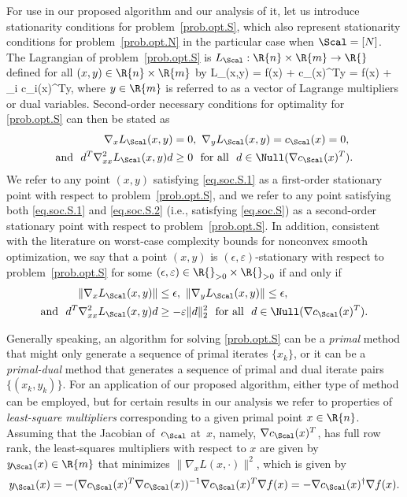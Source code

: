 For use in our proposed algorithm and our analysis of it, let us introduce stationarity conditions for problem~\eqref{prob.opt.S}, which also represent stationarity conditions for problem~\eqref{prob.opt.N} in the particular case when $\Scal = [N]$.  The Lagrangian of problem~\eqref{prob.opt.S} is $L_\Scal : \R{n} \times \R{m} \to \R{}$ defined for all $(x,y) \in \R{n} \times \R{m}$ by
\bequationNN
  L_\Scal(x,y) = f(x) + c_\Scal(x)^Ty = f(x) +  \sum_{i \in \Scal} c_i(x)^Ty,
\eequationNN
where $y \in \R{m}$ is referred to as a vector of Lagrange multipliers or dual variables.  Second-order necessary conditions for optimality for \eqref{prob.opt.S} can then be stated as
\bsubequations\label{eq.soc.S}
  \begin{align}
    \nabla_x L_\Scal(x,y) &= 0,\  \nabla_y L_\Scal(x,y) = c_\Scal(x)=0,\label{eq.soc.S.1} \\ \text{and}\ \ 
    d^T \nabla_{xx}^2 L_\Scal(x,y)d &\geq 0\ \ \text{for all}\ \ d \in \Null(\nabla c_\Scal(x)^T). \label{eq.soc.S.2}
  \end{align}
\esubequations
We refer to any point $(x,y)$ satisfying \eqref{eq.soc.S.1} as a first-order stationary point with respect to problem~\eqref{prob.opt.S}, and we refer to any point satisfying both \eqref{eq.soc.S.1} and \eqref{eq.soc.S.2} (i.e., satisfying \eqref{eq.soc.S}) as a second-order stationary point with respect to problem~\eqref{prob.opt.S}.  In addition, consistent with the literature on worst-case complexity bounds for nonconvex smooth optimization, we say that a point $(x,y)$ is $(\epsilon,\varepsilon)$-stationary with respect to problem~\eqref{prob.opt.S} for some $(\epsilon,\varepsilon) \in \R{}_{>0} \times \R{}_{>0}$ if and only if
\bsubequations\label{eq.soc.S.approx}
  \begin{align}
    \|\nabla_x L_\Scal(x,y)\| &\leq \epsilon,\ \|\nabla_y L_\Scal(x,y)\| \leq \epsilon, \label{eq.soc.S.approx.1} \\ \text{and}\ \ 
    d^T \nabla_{xx}^2 L_\Scal(x,y)d &\geq -\varepsilon\|d\|_2^2\ \ \text{for all}\ \ d \in \Null(\nabla c_\Scal(x)^T). \label{eq.soc.S.approx.2}
  \end{align}
\esubequations

Generally speaking, an algorithm for solving \eqref{prob.opt.S} can be a \emph{primal} method that might only generate a sequence of primal iterates $\{x_k\}$, or it can be a \emph{primal-dual} method that generates a sequence of primal and dual iterate pairs $\{(x_k,y_k)\}$.  For an application of our proposed algorithm, either type of method can be employed, but for certain results in our analysis we refer to properties of \emph{least-square multipliers} corresponding to a given primal point $x \in \R{n}$.  Assuming that the Jacobian of~$c_\Scal$ at~$x$, namely, $\nabla c_\Scal(x)^T$, has full row rank, the least-squares multipliers with respect to $x$ are given by $y_\Scal(x) \in \R{m}$ that minimizes $\|\nabla_x L(x,\cdot)\|^2$, which is given by
\begin{equation}\label{eq.lsm}
  y_\Scal(x) = - (\nabla c_\Scal(x)^T \nabla c_\Scal(x))^{-1} \nabla c_\Scal(x)^T \nabla f(x) = - \nabla c_\Scal(x)^\dag \nabla f(x).
\end{equation}

